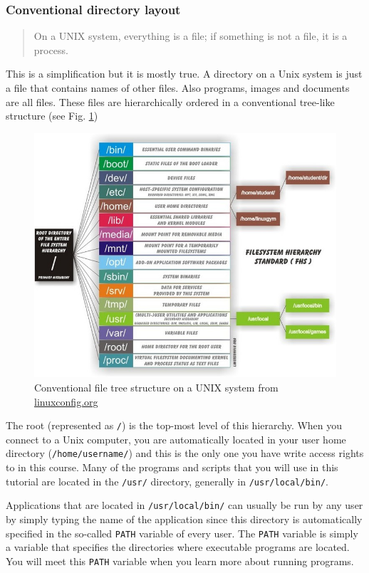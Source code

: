 \documentclass[11pt]{article}
\begin{document}
\subsubsection{Conventional directory layout}
\label{sec:orgheadline2}

\begin{quote}
On a UNIX system, everything is a file; if something is not a file, it is a process.
\end{quote}

This is a simplification but it is mostly true. A directory on a Unix
system is just a file that contains names of other files. Also
programs, images and documents are all files. These files are
hierarchically ordered in a conventional tree-like structure (see
Fig. \ref{fig:orgparagraph2})


\begin{figure}[htb]
\centering
\includegraphics[width=12cm]{linuxfiletree.jpg}
\caption{\label{fig:orgparagraph2}
Conventional file tree structure on a UNIX system from \href{http://linuxconfig.org/filesystem-basics}{linuxconfig.org}}
\end{figure}


The root (represented as \texttt{/}) is the top-most level of this hierarchy.
When you connect to a Unix computer, you are automatically located in
your user home directory (\texttt{/home/username/}) and this is the only one
you have write access rights to in this course. Many of the programs and
scripts that you will use in this tutorial are located in the \texttt{/usr/}
directory, generally in \texttt{/usr/local/bin/}. 

Applications that are located in \texttt{/usr/local/bin/} can usually be run by any
user by simply typing the name of the application since this directory is automatically specified in the so-called
\texttt{PATH} variable of every user. The \texttt{PATH} variable is simply a
variable that specifies the directories where executable programs are
located. You will meet this \texttt{PATH} variable when you learn more about
running programs.
\end{document}
